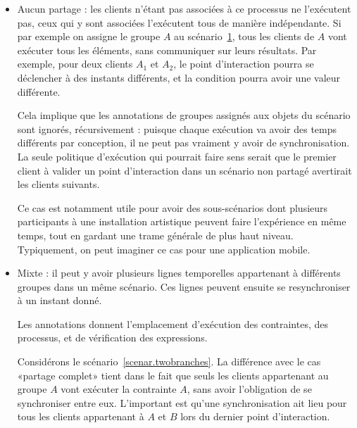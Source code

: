 \documentclass{article}
\newcommand\trigger{point d'interaction\xspace}
\begin{document}
\begin{itemize}
    \item Aucun partage : les clients n'étant pas associées à ce processus ne l'exécutent pas, ceux qui y sont associées l'exécutent tous de manière indépendante.
    Si par exemple on assigne le groupe $A$ au scénario~\ref{scenar.general}, tous les clients de $A$ vont exécuter tous les éléments, sans communiquer sur leurs résultats. 
    Par exemple, pour deux clients $A_1$ et $A_2$, le \trigger pourra se déclencher à des instants différents, et la condition pourra avoir une valeur différente.
    
    Cela implique que les annotations de groupes assignés aux objets du scénario sont ignorés, récursivement : puisque chaque exécution va avoir des temps différents par conception, il ne peut pas vraiment y avoir de synchronisation.
    La seule politique d'exécution qui pourrait faire sens serait que le premier client à valider un \trigger dans un scénario non partagé avertirait les clients suivants.
    
    Ce cas est notamment utile pour avoir des sous-scénarios dont plusieurs participants à une installation artistique peuvent faire l'expérience en même temps, tout en gardant une trame générale de plus haut niveau. 
    Typiquement, on peut imaginer ce cas pour une application mobile.
    
    \begin{figure}[h]
        \centering
        \begin{tikzpicture}
        
        \end{tikzpicture}
        \label{scenar.general}
    \end{figure}

    \item Mixte : il peut y avoir plusieurs lignes temporelles appartenant à différents groupes dans un même scénario. Ces lignes peuvent ensuite se resynchroniser à un instant donné. 
    
    Les annotations donnent l'emplacement d'exécution des contraintes, des processus, et de vérification des expressions. 
    
    Considérons le scénario~\ref{scenar.twobranches}. 
    La différence avec le cas «partage complet» tient dans le fait que seuls les clients appartenant au groupe $A$ vont exécuter la contrainte $A$, sans avoir l'obligation de se synchroniser entre eux. 
    L'important est qu'une synchronisation ait lieu pour tous les clients appartenant à $A$ et $B$ lors du dernier \trigger.
    

\end{itemize}
\end{document}
